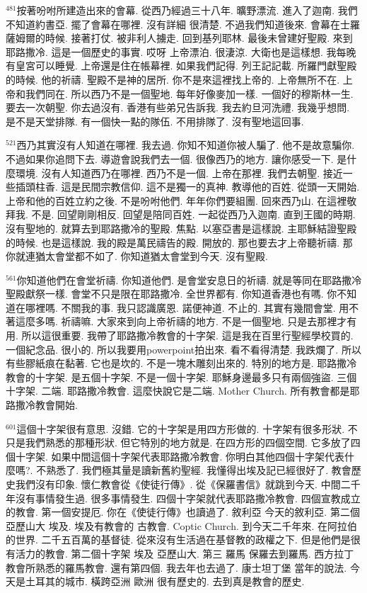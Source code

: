 \documentclass{book}
\begin{document}
$^{481}$按著吩咐所建造出來的會幕.
從西乃經過三十八年.
曠野漂流.
進入了迦南.
我們不知道約書亞.
擺了會幕在哪裡.
沒有詳細 很清楚.
不過我們知道後來.
會幕在士羅薩姆爾的時候.
接著打仗.
被非利人擄走.
回到基列耶林.
最後未曾建好聖殿.
來到耶路撒冷.
這是一個歷史的事實.
哎呀 上帝漂泊.
很淒涼.
大衛也是這樣想.
我每晚有皇宮可以睡覺.
上帝還是住在帳幕裡.
如果我們記得.
列王記記載.
所羅門獻聖殿的時候.
他的祈禱.
聖殿不是神的居所.
你不是來這裡找上帝的.
上帝無所不在.
上帝和我們同在.
所以西乃不是一個聖地.
每年好像麥加一樣.
一個好的穆斯林一生.
要去一次朝聖.
你去過沒有.
香港有些弟兄告訴我.
我去約旦河洗禮.
我幾乎想問.
是不是天堂排隊.
有一個快一點的隊伍.
不用排隊了.
沒有聖地這回事.

$^{521}$西乃其實沒有人知道在哪裡.
我去過.
你知不知道你被人騙了.
他不是故意騙你.
不過如果你追問下去.
導遊會說我們去一個.
很像西乃的地方.
讓你感受一下.
是什麼環境.
沒有人知道西乃在哪裡.
西乃不是一個.
上帝在那裡.
我們去朝聖.
接近一些插頭柱香.
這是民間宗教信仰.
這不是獨一的真神.
教導他的百姓.
從頭一天開始.
上帝和他的百姓立約之後.
不是吩咐他們.
年年你們要組團.
回來西乃山.
在這裡敬拜我.
不是.
回望剛剛相反.
回望是陪同百姓.
一起從西乃入迦南.
直到王國的時期.
沒有聖地的.
就算去到耶路撒冷的聖殿.
焦點.
以塞亞書是這樣說.
主耶穌結證聖殿的時候.
也是這樣說.
我的殿是萬民禱告的殿.
開放的.
那也要去才上帝聽祈禱.
那你就連猶太會堂都不如了.
你知道猶太會堂到今天.
沒有聖殿.

$^{561}$你知道他們在會堂祈禱.
你知道他們.
是會堂安息日的祈禱.
就是等同在耶路撒冷聖殿獻祭一樣.
會堂不只是限在耶路撒冷.
全世界都有.
你知道香港也有嗎.
你不知道在哪裡嗎.
不關我的事.
我只認識廣恩.
諾便神道.
不止的.
其實有幾間會堂.
用不著這麼多嗎.
祈禱嘛.
大家來到向上帝祈禱的地方.
不是一個聖地.
只是去那裡才有用.
所以這很重要.
我帶了耶路撒冷教會的十字架.
這是我在百里行聖經學校買的.
一個紀念品.
很小的.
所以我要用powerpoint拍出來.
看不看得清楚.
我跌爛了.
所以有些膠紙痕在黏著.
它也是坎的.
不是一塊木雕刻出來的.
特別的地方是.
耶路撒冷教會的十字架.
是五個十字架.
不是一個十字架.
耶穌身邊最多只有兩個強盜.
三個十字架.
二端.
耶路撒冷教會.
這麼快說它是二端.
Mother Church.
所有教會都是耶路撒冷教會開始.

$^{601}$這個十字架很有意思.
沒錯.
它的十字架是用四方形做的.
十字架有很多形狀.
不只是我們熟悉的那種形狀.
但它特別的地方就是.
在四方形的四個空間.
它多放了四個十字架.
如果中間這個十字架代表耶路撒冷教會.
你明白其他四個十字架代表什麼嗎?.
不熟悉了.
我們極其量是讀新舊約聖經.
我懂得出埃及記已經很好了.
教會歷史我們沒有印象.
懷仁教會從《使徒行傳》.
從《保羅書信》就跳到今天.
中間二千年沒有事情發生過.
很多事情發生.
四個十字架就代表耶路撒冷教會.
四個宣教成立的教會.
第一個安提厄.
你在《使徒行傳》也讀過了.
敘利亞 今天的敘利亞.
第二個亞歷山大 埃及.
埃及有教會的 古教會.
Coptic Church.
到今天二千年來.
在阿拉伯的世界.
二千五百萬的基督徒.
從來沒有生活過在基督教的政權之下.
但是他們是很有活力的教會.
第二個十字架 埃及 亞歷山大.
第三 羅馬 保羅去到羅馬.
西方拉丁教會所熟悉的羅馬教會.
還有第四個.
我去年也去過了.
康士坦丁堡 當年的說法.
今天是土耳其的城市.
橫跨亞洲 歐洲 很有歷史的.
去到真是教會的歷史.
\end{document}
